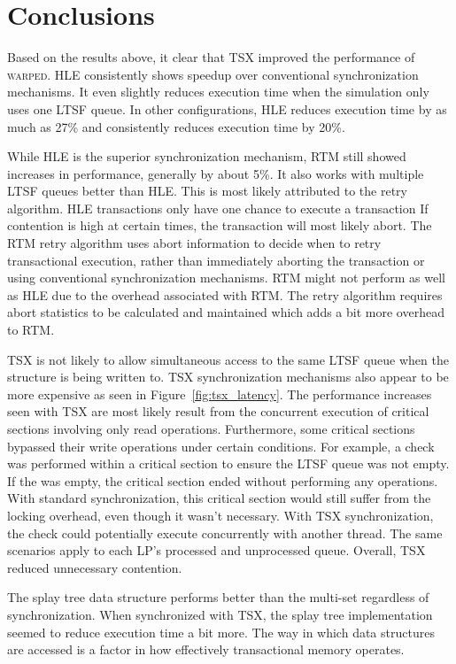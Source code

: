 \documentclass[11pt]{book}
\begin{document}
\section{Conclusions}

Based on the results above, it clear that TSX improved the performance of \textsc{warped}.
HLE consistently shows speedup over conventional synchronization mechanisms.  It even
slightly reduces execution time when the simulation only uses one LTSF queue.  In other
configurations, HLE reduces execution time by as much as 27\% and consistently
reduces execution time by 20\%.   

While HLE is the superior synchronization mechanism, RTM still showed increases
in performance, generally by about 5\%.  It also works with multiple
LTSF queues better than HLE.  This is most likely attributed to the retry
algorithm.  HLE transactions only have one chance to execute a transaction  If
contention is high at certain times, the transaction will most likely abort.
The RTM retry algorithm uses abort information to decide when to retry
transactional execution, rather than immediately aborting the transaction or
using conventional synchronization mechanisms.  RTM might not perform as well as
HLE due to the overhead associated with RTM.  The retry algorithm requires abort
statistics to be calculated and maintained which adds a bit more overhead to
RTM.  

TSX is not likely to allow simultaneous access to the same LTSF queue
when the structure is being written to.  TSX synchronization mechanisms also
appear to be more expensive as seen in Figure~\ref{fig:tsx_latency}.  The performance
increases seen with TSX are most likely result from the concurrent execution of 
critical sections involving only read operations.  Furthermore, some critical
sections bypassed their write operations under certain conditions.
For example, a check was performed within a critical section to ensure the LTSF
queue was not empty.  If the was empty, the critical section ended without performing
any operations.  With standard synchronization, this critical section would still
suffer from the locking overhead, even though it wasn't necessary.  With TSX
synchronization, the check could potentially execute concurrently with another
thread.  The same scenarios apply to each LP's processed and unprocessed queue.
Overall, TSX reduced unnecessary contention. 

The splay tree data structure performs better than the multi-set regardless of
synchronization.  When synchronized with TSX, the splay tree implementation
seemed to reduce execution time a bit more.  The way in which data structures
are accessed is a factor in how effectively transactional memory operates. 
\end{document}
